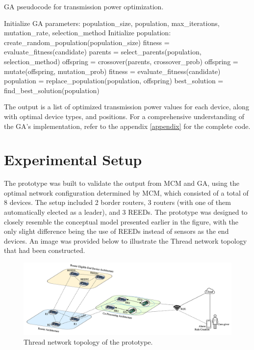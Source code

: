 \begin{algorithm}[H]
    \caption{\gls{GA} pseudocode for transmission power optimization.}
    \label{alg:genetic_algorithm}
    \begin{algorithmic}[1]
    \STATE Initialize \gls{GA} parameters: population\_size, population, max\_iterations, mutation\_rate, selection\_method
    \STATE Initialize population: create\_random\_population(population\_size)
        \STATE fitness = evaluate\_fitness(candidate)
    \ENDFOR
        \STATE parents = select\_parents(population, selection\_method)
        \STATE offspring = crossover(parents, crossover\_prob)
        \STATE offspring = mutate(offspring, mutation\_prob)
            \STATE fitness = evaluate\_fitness(candidate)
        \ENDFOR
        \STATE population = replace\_population(population, offspring)
    \ENDFOR
    \STATE best\_solution = find\_best\_solution(population)
    \end{algorithmic}
\end{algorithm}

The output is a list of optimized transmission power values for each device, along with optimal device types, and positions. For a comprehensive understanding of the \acrlong{GA}'s implementation, refer to the appendix \ref{appendix} for the complete code.

\section{Experimental Setup}

The prototype was built to validate the output from \gls{MCM} and \gls{GA}, using the optimal network configuration determined by \gls{MCM}, which consisted of a total of 8 devices. The setup included 2 border routers, 3 routers (with one of them automatically elected as a leader), and 3 \glspl{REED}. The prototype was designed to closely resemble the conceptual model presented earlier in the figure, with the only slight difference being the use of \glspl{REED} instead of sensors as the end devices. An image was provided below to illustrate the Thread network topology that had been constructed.

\begin{figure}[H]
    \centering
    \includegraphics[width=1\textwidth]{images/research_design/prototype.png}
    \caption{Thread network topology of the prototype.}
    \label{fig:prototype}
\end{figure}

